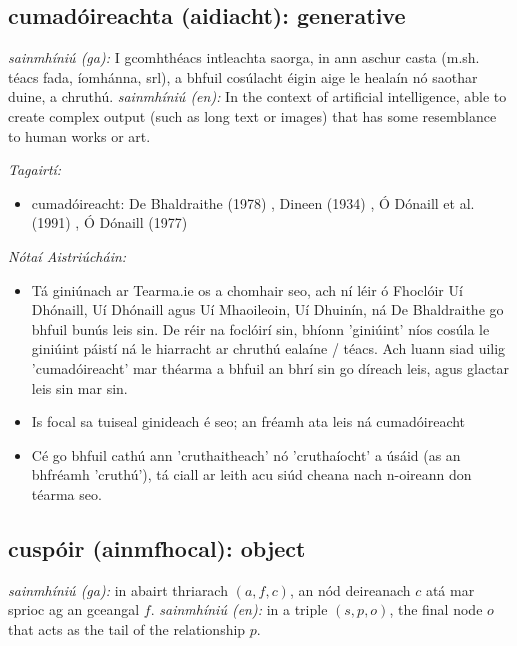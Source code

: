 \documentclass{article}
\begin{document}
\subsection*{cumadóireachta (aidiacht): generative} 
 \noindent \textit{sainmhíniú (ga):} I gcomhthéacs intleachta saorga, in ann aschur casta (m.sh. téacs fada, íomhánna, srl), a bhfuil cosúlacht éigin aige le healaín nó saothar duine, a chruthú.
\newline\newline
 \noindent \textit{sainmhíniú (en):} In the context of artificial intelligence, able to create complex output (such as long text or images) that has some resemblance to human works or art.
\newline

 \noindent \textit{Tagairtí:}
\begin{itemize}
	\item cumadóireacht: De Bhaldraithe (1978) \cite{de-bhaldraithe}, Dineen (1934) \cite{dineen}, Ó Dónaill et al. (1991) \cite{focloir-beag}, Ó Dónaill (1977) \cite{odonaill}
\end{itemize}

 \noindent \textit{Nótaí Aistriúcháin:}
\begin{itemize}
	\item Tá giniúnach ar Tearma.ie os a chomhair seo, ach ní léir ó Fhoclóir Uí Dhónaill, Uí Dhónaill agus Uí Mhaoileoin, Uí Dhuinín, ná De Bhaldraithe go bhfuil bunús leis sin. De réir na foclóirí sin, bhíonn 'giniúint' níos cosúla le giniúint páistí ná le hiarracht ar chruthú ealaíne / téacs. Ach luann siad uilig 'cumadóireacht' mar théarma a bhfuil an bhrí sin go díreach leis, agus glactar leis sin mar sin.
	\item Is focal sa tuiseal ginideach é seo; an fréamh ata leis ná cumadóireacht
	\item Cé go bhfuil cathú ann 'cruthaitheach' nó 'cruthaíocht' a úsáid (as an bhfréamh 'cruthú'), tá ciall ar leith acu siúd cheana nach n-oireann don téarma seo.
\end{itemize}


\subsection*{cuspóir (ainmfhocal): object} 
 \noindent \textit{sainmhíniú (ga):} in abairt thriarach $(a,f,c)$, an nód deireanach $c$ atá mar sprioc ag an gceangal $f$.
\newline\newline
 \noindent \textit{sainmhíniú (en):} in a triple $(s,p,o)$, the final node $o$ that acts as the tail of the relationship $p$.
\newline
\end{document}
